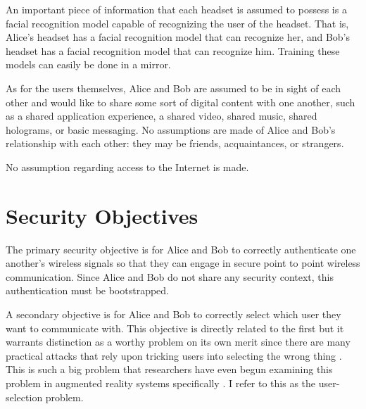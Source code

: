 \documentclass[12pt]{report}
\begin{document}
An important piece of information that each headset is assumed to possess is a facial recognition model capable of recognizing the user of the headset. That is, Alice's headset has a facial recognition model that can recognize her, and Bob's headset has a facial recognition model that can recognize him. Training these models can easily be done in a mirror. \par

As for the users themselves, Alice and Bob are assumed to be in sight of each other and would like to share some sort of digital content with one another, such as a shared application experience, a shared video, shared music, shared holograms, or basic messaging. No assumptions are made of Alice and Bob's relationship with each other: they may be friends, acquaintances, or strangers. \par

No assumption regarding access to the Internet is made. \par

\section{Security Objectives}
The primary security objective is for Alice and Bob to correctly authenticate one another's wireless signals so that they can engage in secure point to point wireless communication. Since Alice and Bob do not share any security context, this authentication must be bootstrapped. \par

A secondary objective is for Alice and Bob to correctly select which user they want to communicate with. This objective is directly related to the first but it warrants distinction as a worthy problem on its own merit since there are many practical attacks that rely upon tricking users into selecting the wrong thing \cite{PairingInterfaceConstrainedRushingSaxena2009,WhyPhishingWorksDhamija2006}. This is such a big problem that researchers have even begun examining this problem in augmented reality systems specifically \cite{SecurityAndPrivacyForARRoesner2014}. I refer to this as the user-selection problem. \par
\end{document}
